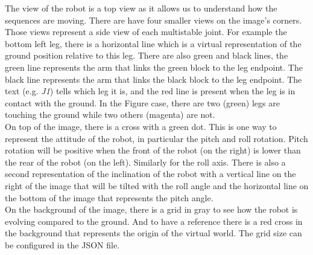         The view of the robot is a top view as it allows us to understand how the sequences are moving. There are have four smaller views on the image's corners. Those views represent a side view of each multistable joint. For example the bottom left leg, there is a horizontal line which is a virtual representation of the ground position relative to this leg. There are also green and black lines, the green line represents the arm that links the green block to the leg endpoint. The black line represents the arm that links the black block to the leg endpoint. The text (e.g. \textit{J1}) tells which leg it is, and the red line is present when the leg is in contact with the ground. In the Figure case, there are two (green) legs are touching the ground while two others (magenta) are not.\\
        
        On top of the image, there is a cross with a green dot. This is one way to represent the attitude of the robot, in particular the pitch and roll rotation. Pitch rotation will be positive when the front of the robot (on the right) is lower than the rear of the robot (on the left). Similarly for the roll axis. There is also a second representation of the inclination of the robot with a vertical line on the right of the image that will be tilted with the roll angle and the horizontal line on the bottom of the image that represents the pitch angle.\\
        
        On the background of the image, there is a grid in gray to see how the robot is evolving compared to the ground. And to have a reference there is a red cross in the background that represents the origin of the virtual world. The grid size can be configured in the JSON file. 
        
